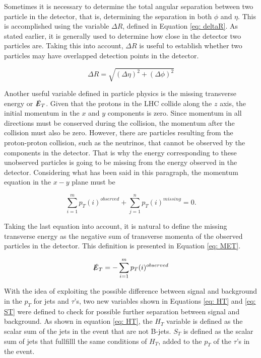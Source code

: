 Sometimes it is necessary to determine the total angular separation between two particle in the detector, that is, determining the separation in both $\phi$ and $\eta$. This is accomplished using the variable $\Delta R$, defined in Equation \ref{eq: deltaR}. As stated earlier, it is generally used to determine how close in the detector two particles are. Taking this into account, $\Delta R$ is useful to establish whether two particles may have overlapped detection points in the detector. 

\begin{equation}\label{eq: deltaR}
\Delta R = \sqrt{\left(\Delta \eta\right)^{2} + \left(\Delta \phi \right)^{2}}
\end{equation}

Another useful variable defined in particle physics is the missing transverse energy or $\slashed{E}_{T}$. Given that the protons in the LHC collide along the $z$ axis, the initial momentum in the $x$ and $y$ components is zero. Since momentum in all directions must be conserved during the collision, the momentum after the collision must also be zero. However, there are particles resulting from the proton-proton collision, such as the neutrinos, that cannot be observed by the components in the detector. That is why the energy corresponding to these unobserved particles is going to be missing from the energy observed in the detector. Considering what has been said in this paragraph, the momentum equation in the $x-y$ plane must be

$$ \sum_{i=1}^{m} p_{T}(i)^{observed} + \sum_{j=1}^{n} p_{T}(i)^{missing} = 0 .$$

Taking the last equation into account, it is natural to define the missing transverse energy as the negative sum of transverse momenta of the observed particles in the detector. This definition is presented in Equation \ref{eq: MET}.

\begin{equation}\label{eq: MET}
\slashed{E}_{T} = -\sum_{i=1}^{m} p_{T}(i)^{observed}
\end{equation} 

With the idea of exploiting the possible difference between signal and background in the $p_{T}$ for jets and $\tau$'s, two new variables shown in Equations \ref{eq: HT} and \ref{eq: ST} were defined to check for possible further separation between signal and background. As shown in equation \ref{eq: HT}, the $H_{T}$ variable is defined as the scalar sum of the jets in the event that are not B-jets. $S_{T}$ is defined as the scalar sum of jets that fullfilll the same conditions of $H_{T}$, added to the $p_{T}$ of the $\tau$'s in the event.


